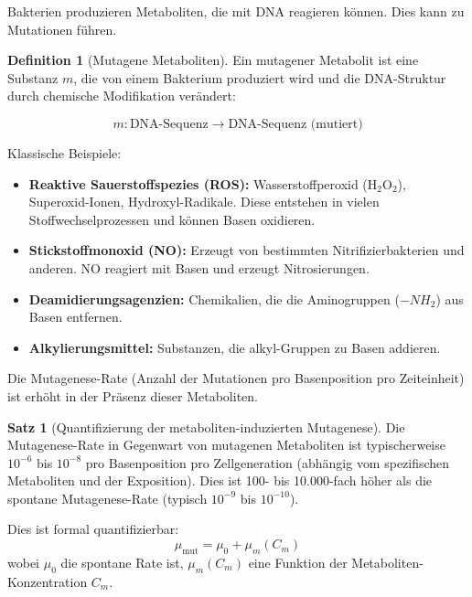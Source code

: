 \documentclass[a4paper,12pt]{article}
\theoremstyle{definition}
\newtheorem{definition}{Definition}
\newtheorem{satz}{Satz}
\begin{document}
Bakterien produzieren Metaboliten, die mit DNA reagieren können. Dies kann zu Mutationen führen.

\begin{definition}[Mutagene Metaboliten]
Ein mutagener Metabolit ist eine Substanz $m$, die von einem Bakterium produziert wird und die DNA-Struktur durch chemische Modifikation verändert:

\[
m: \text{DNA-Sequenz} \to \text{DNA-Sequenz (mutiert)}
\]

Klassische Beispiele:
\begin{itemize}
    \item[-] \textbf{Reaktive Sauerstoffspezies (ROS):} Wasserstoffperoxid ($\text{H}_2\text{O}_2$), Superoxid-Ionen, Hydroxyl-Radikale. Diese entstehen in vielen Stoffwechselprozessen und können Basen oxidieren.
    \item[-] \textbf{Stickstoffmonoxid (NO):} Erzeugt von bestimmten Nitrifizierbakterien und anderen. NO reagiert mit Basen und erzeugt Nitrosierungen.
    \item[-] \textbf{Deamidierungsagenzien:} Chemikalien, die die Aminogruppen ($-NH_{2}$) aus Basen entfernen.
    \item[-] \textbf{Alkylierungsmittel:} Substanzen, die alkyl-Gruppen zu Basen addieren.
\end{itemize}

Die Mutagenese-Rate (Anzahl der Mutationen pro Basenposition pro Zeiteinheit) ist erhöht in der Präsenz dieser Metaboliten.
\end{definition}

\begin{satz}[Quantifizierung der metaboliten-induzierten Mutagenese]
Die Mutagenese-Rate in Gegenwart von mutagenen Metaboliten ist typischerweise $10^{-6}$ bis $10^{-8}$ pro Basenposition pro Zellgeneration (abhängig vom spezifischen Metaboliten und der Exposition). Dies ist 100- bis 10.000-fach höher als die spontane Mutagenese-Rate (typisch $10^{-9}$ bis $10^{-10}$).

Dies ist formal quantifizierbar:
\[
\mu_{\text{mut}} = \mu_0 + \mu_m(C_m)
\]
wobei $\mu_0$ die spontane Rate ist, $\mu_m(C_m)$ eine Funktion der Metaboliten-Konzentration $C_m$.
\end{satz}
\end{document}
